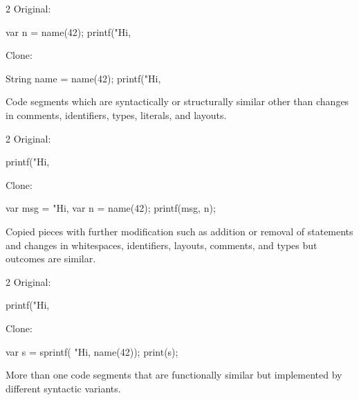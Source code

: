 \documentclass{article}
\begin{document}
\begin{multicols}{2}
Original:\par
{\small\begin{ffcode}
var n = name(42);
printf("Hi, %
\end{ffcode}
}
Clone:\par
{\small\begin{ffcode}
String name = name(42);
printf("Hi, %
\end{ffcode}
}
\par\columnbreak\par
Code segments which are syntactically or structurally similar other than changes in comments, identifiers, types, literals, and layouts.
\end{multicols}
\plush{}

\begin{multicols}{2}
Original:\par
{\small\begin{ffcode}
printf("Hi, %
\end{ffcode}
}
Clone:\par
{\small\begin{ffcode}
var msg = "Hi, %
var n = name(42);
printf(msg, n);
\end{ffcode}
}
\par\columnbreak\par
Copied pieces with further modification such as addition or removal of statements and changes in whitespaces, identifiers, layouts, comments, and types but outcomes are similar.
\end{multicols}
\plush{}

\begin{multicols}{2}
Original:\par
{\small\begin{ffcode}
printf("Hi, %
\end{ffcode}
}
Clone:\par
{\small\begin{ffcode}
var s = sprintf(
  "Hi, %
  name(42));
print(s);
\end{ffcode}
}
\par\columnbreak\par
More than one code segments that are functionally similar but implemented by different syntactic variants.
\end{multicols}
\plush{}
\end{document}
